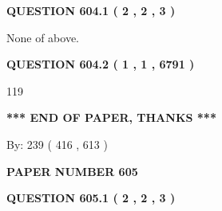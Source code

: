 \documentclass[12pt]{article}
\begin{document}
\vspace{0.2in}
  
{\textbf{\Large{QUESTION
604.1 
 ( 2 , 2 , 3 )
}}}
  
  
 
 
\noindent{}
 
 
 None of above.
 
 
 
 
  
\vspace{0.2in}
  
{\textbf{\Large{QUESTION
604.2 
 ( 1 , 1 , 6791 )
}}}
  
  
 
 
\noindent{}

119
 
 
   
   
 \vspace{0.2in}
 
   
   
   
   
\vspace{1.0in} 
{\textbf{\large{ *** END OF PAPER, THANKS *** }}} 
   
   
\hspace{1.0in} By: 
 239 ( 416 ,  613 )
   
   
   
   
\newpage 
\setcounter{page}{ 
   605001 } 
   
   
   
   
 {\textbf{ \Large{ PAPER NUMBER  605  }}}
   
   
\vspace{0.2in}
   
   
   
   
   
   
 \vspace{0.2in}
 
 
 
 
   
   
  
\vspace{0.2in}
  
{\textbf{\Large{QUESTION
605.1 
 ( 2 , 2 , 3 )
}}}
  
  
 
 
\noindent{}
 
\end{document}
